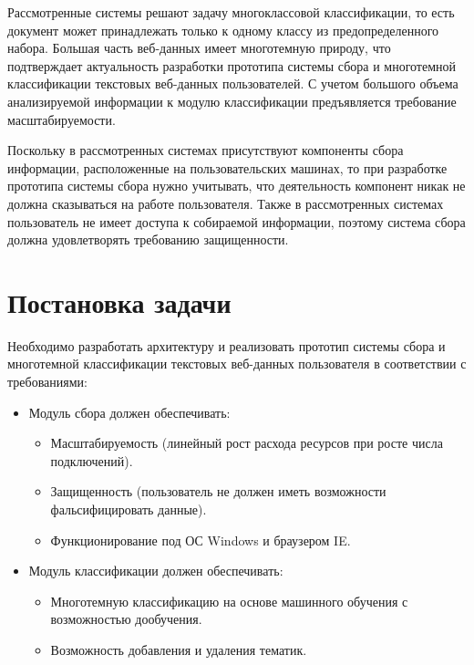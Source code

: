 \documentclass[russian, utf8, emptystyle]{eskdtext}
\begin{document}
Рассмотренные системы решают задачу многоклассовой классификации, то есть документ может принадлежать только к одному классу из предопределенного набора. Большая часть веб-данных имеет многотемную природу, что подтверждает актуальность разработки прототипа системы сбора и многотемной классификации текстовых веб-данных пользователей. С учетом большого объема анализируемой информации к модулю классификации предъявляется требование масштабируемости. 

Поскольку в рассмотренных системах присутствуют компоненты сбора информации, расположенные на пользовательских машинах, то при разработке прототипа системы сбора нужно учитывать, что деятельность компонент никак не должна сказываться на работе пользователя. Также в рассмотренных системах пользователь не имеет доступа к собираемой информации, поэтому система сбора должна удовлетворять требованию защищенности.
\section{Постановка задачи}
Необходимо разработать архитектуру и реализовать прототип системы сбора и многотемной классификации текстовых веб-данных пользователя в соответствии  с требованиями:
\begin{itemize}
	\item Модуль сбора должен обеспечивать:
	\begin{itemize}
		\item Масштабируемость (линейный рост расхода ресурсов при росте числа подключений).
		\item Защищенность (пользователь не должен иметь возможности фальсифицировать данные).
		\item Функционирование под ОС Windows и браузером IE. 
	\end{itemize}
	\item Модуль классификации должен обеспечивать:
		\begin{itemize}
			\item Многотемную классификацию на основе машинного обучения с возможностью дообучения.
			\item Возможность добавления и удаления тематик.
		\end{itemize}
\end{itemize}
\end{document}
